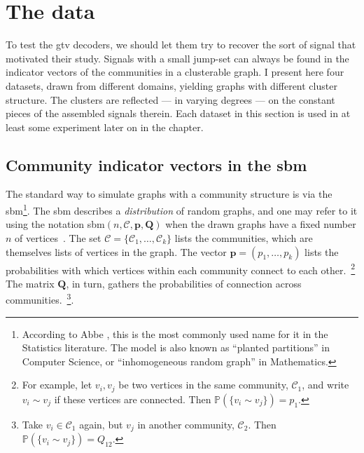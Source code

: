 \section{The data}

To test the \acrshort{gtv} decoders, we should let them try to recover the sort of signal that motivated their study. Signals with a small jump-set can always be found in the indicator vectors of the communities in a clusterable graph. I present here four datasets, drawn from different domains, yielding graphs with different cluster structure. The clusters are reflected --- in varying degrees --- on the constant pieces of the assembled signals therein. Each dataset in this section is used in at least some experiment later on in the chapter.

\subsection{Community indicator vectors in the \texorpdfstring{\acrlong{sbm}}{Stochastic Block Model}}

The standard way to simulate graphs with a community structure is via the \acrfull{sbm}\footnote{According to Abbe \cite{abbe2018}, this is the most commonly used name for it in the Statistics literature. The model is also known as ``planted partitions'' in Computer Science, or ``inhomogeneous random graph'' in Mathematics.}. The \acrshort{sbm} describes a \emph{distribution} of random graphs, and one may refer to it using the notation \acrshort{sbm}$(n, \mathcal{C}, \mathbf{p}, \mathbf{Q})$ when the drawn graphs have a fixed number $n$ of vertices~\cite{abbe2018}. The set $\mathcal{C} = \{\mathcal{C}_1 , \dots, \mathcal{C}_k \}$ lists the communities, which are themselves lists of vertices in the graph. The vector $\mathbf{p} = (p_1, \dots, p_k)$ lists the probabilities with which vertices within each community connect to each other.~\footnote{For example, let $v_i, v_j$ be two vertices in the same community, $\mathcal{C}_1$, and write $v_i \sim v_j$ if these vertices are connected. Then $\mathbb{P} ( \{  v_i \sim v_j \}) = p_1$.} The matrix $\mathbf{Q}$, in turn, gathers the probabilities of connection across communities.~\footnote{Take $v_i \in \mathcal{C}_1$ again, but $v_j$ in another community, $\mathcal{C}_2$. Then $\mathbb{P} ( \{  v_i \sim v_j \}) = Q_{12}$.}.

